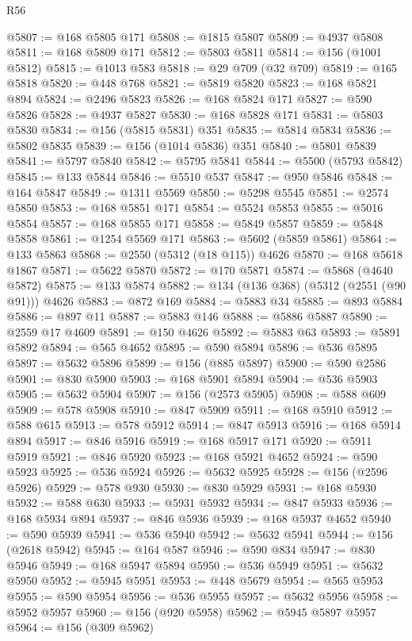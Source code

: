\begin{lexlean}{R56}
\begin{coremodule}
{{{{{{{{{{{{{{{{{{{{{{{{{{{{{{{{{{{{{{{{{{{{{{{{{{{{{{{{{{{{{{{{{{{{{{{{{{{{{{{{{{{{{{{{{{{{{{{{{{{{{{{{{{{{{{{{{{{{{{{{{{{{{{{{{{{{{{{{{{{{{{{{{{{{{{{{{{{{{{{{{{{{{{{{{{{{{{{{{{{{{{{{{{{{{{{{{{{{{{{{{{{{{{{{{{{@5807 := @168 @5805 @171
@5808 := @1815 @5807
@5809 := @4937 @5808
@5811 := @168 @5809 @171
@5812 := @5803 @5811
@5814 := @156 (@1001 @5812)
@5815 := @1013 @583
@5818 := @29 @709 (@32 @709)
@5819 := @165 @5818
@5820 := @448 @768
@5821 := @5819 @5820
@5823 := @168 @5821 @894
@5824 := @2496 @5823
@5826 := @168 @5824 @171
@5827 := @590 @5826
@5828 := @4937 @5827
@5830 := @168 @5828 @171
@5831 := @5803 @5830
@5834 := @156 (@5815 @5831) @351
@5835 := @5814 @5834
@5836 := @5802 @5835
@5839 := @156 (@1014 @5836) @351
@5840 := @5801 @5839
@5841 := @5797 @5840
@5842 := @5795 @5841
@5844 := @5500 (@5793 @5842)
@5845 := @133 @5844
@5846 := @5510 @537
@5847 := @950 @5846
@5848 := @164 @5847
@5849 := @1311 @5569
@5850 := @5298 @5545
@5851 := @2574 @5850
@5853 := @168 @5851 @171
@5854 := @5524 @5853
@5855 := @5016 @5854
@5857 := @168 @5855 @171
@5858 := @5849 @5857
@5859 := @5848 @5858
@5861 := @1254 @5569 @171
@5863 := @5602 (@5859 @5861)
@5864 := @133 @5863
@5868 := @2550 (@5312 (@18 @115)) @4626
@5870 := @168 @5618 @1867
@5871 := @5622 @5870
@5872 := @170 @5871
@5874 := @5868 (@4640 @5872)
@5875 := @133 @5874
@5882 := @134 (@136 @368) (@5312 (@2551 (@90 @91))) @4626
@5883 := @872 @169
@5884 := @5883 @34
@5885 := @893 @5884
@5886 := @897 @11
@5887 := @5883 @146
@5888 := @5886 @5887
@5890 := @2559 @17 @4609
@5891 := @150 @4626
@5892 := @5883 @63
@5893 := @5891 @5892
@5894 := @565 @4652
@5895 := @590 @5894
@5896 := @536 @5895
@5897 := @5632 @5896
@5899 := @156 (@885 @5897)
@5900 := @590 @2586
@5901 := @830 @5900
@5903 := @168 @5901 @5894
@5904 := @536 @5903
@5905 := @5632 @5904
@5907 := @156 (@2573 @5905)
@5908 := @588 @609
@5909 := @578 @5908
@5910 := @847 @5909
@5911 := @168 @5910
@5912 := @588 @615
@5913 := @578 @5912
@5914 := @847 @5913
@5916 := @168 @5914 @894
@5917 := @846 @5916
@5919 := @168 @5917 @171
@5920 := @5911 @5919
@5921 := @846 @5920
@5923 := @168 @5921 @4652
@5924 := @590 @5923
@5925 := @536 @5924
@5926 := @5632 @5925
@5928 := @156 (@2596 @5926)
@5929 := @578 @930
@5930 := @830 @5929
@5931 := @168 @5930
@5932 := @588 @630
@5933 := @5931 @5932
@5934 := @847 @5933
@5936 := @168 @5934 @894
@5937 := @846 @5936
@5939 := @168 @5937 @4652
@5940 := @590 @5939
@5941 := @536 @5940
@5942 := @5632 @5941
@5944 := @156 (@2618 @5942)
@5945 := @164 @587
@5946 := @590 @834
@5947 := @830 @5946
@5949 := @168 @5947 @5894
@5950 := @536 @5949
@5951 := @5632 @5950
@5952 := @5945 @5951
@5953 := @448 @5679
@5954 := @565 @5953
@5955 := @590 @5954
@5956 := @536 @5955
@5957 := @5632 @5956
@5958 := @5952 @5957
@5960 := @156 (@920 @5958)
@5962 := @5945 @5897 @5957
@5964 := @156 (@309 @5962)
}}}}}}}}}}}}}}}}}}}}}}}}}}}}}}}}}}}}}}}}}}}}}}}}}}}}}}}}}}}}}}}}}}}}}}}}}}}}}}}}}}}}}}}}}}}}}}}}}}}}}}}}}}}}}}}}}}}}}}}}}}}}}}}}}}}}}}}}}}}}}}}}}}}}}}}}}}}}}}}}}}}}}}}}}}}}}}}}}}}}}}}}}}}}}}}}}}}}}}}}}}}}}}}}}}}
\end{coremodule}
\end{lexlean}
